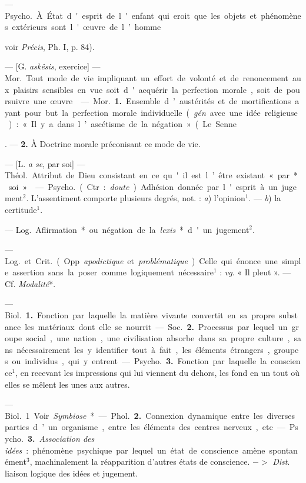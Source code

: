 \begin{itemize}[leftmargin=1cm, label=, itemsep=1pt]
{{{{ — \si{Psycho.} À État d'esprit
de l'enfant qui eroit que les objets
et phénomènes extérieurs sont l'œuvre de l’homme {voir {\it Précis}, Ph. I,
p. 84).

 — [G. {\it askêsis}, exercice] — \si{Mor.}
Tout mode de vie impliquant un
effort de volonté et de renoncement
aux plaisirs sensibles en vue soit
d'acquérir la perfection morale, soit
de poursuivre une œuvre.

 — \si{Mor.} {\bf 1.} Ensemble d’austérités et de mortifications ayant
pour but la perfection morale individuelle ({\it gén}. avec une idée
religieuse) : « Il y a dans l’ascétisme de
la négation » (Le Senne}. — {\bf 2.} À
Doctrine morale préconisant ce
mode de vie.

 — [L. {\it a se}, par soi] — \si{Théol.}
Attribut de Dieu consistant en ce
qu'il est l’être existant « par* soi ».

 — \si{Psycho.} (Ctr. : {\it doute}).
Adhésion donnée par l'esprit à un
jugement$^2$. L’assentiment comporte
plusieurs degrés, not. : {\it a}) l'opinion$^1$.
— {\it b}) la certitude$^1$.

 — \si{Log.} Aflirmation* ou
négation de la {\it lexis}* d'un jugement$^2$.

 — \si{Log.}
et \si{Crit.} (Opp. {\it apodictique} et {\it problématique}). Celle qui énonce une
simple assertion sans la poser comme
logiquement nécessaire$^1$ : {\it vg}. « Il
pleut ». — Cf. {\it Modalité}*.


 — \si{Biol.} {\bf 1.} Fonction
par laquelle la matière vivante convertit en sa propre substance les
matériaux dont elle se nourrit.

— \si{Soc.} {\bf 2.} Processus par lequel un
groupe social, une nation, une civilisation absorbe dans sa propre
culture, sans nécessairement les y identifier tout à fait,
les éléments étrangers, groupes ou individus, qui y
entrent.

— \si{Psycho.} {\bf 3.} Fonction par laquelle la conscience$^1$, en recevant
les impressions qui lui viennent du
dehors, les fond en un tout où elles
se mêlent les unes aux autres.


 — \si{Biol.} 1 Voir {\it Symbiose}*.

— \si{Phol.} {\bf 2.} Connexion dynamique
entre les diverses parties d’un organisme, entre les éléments des centres
nerveux, etc.

— \si{Psycho.} {\bf 3.} {\it Association des
idées} : phénomène psychique par
lequel un état de conscience amène
spontanément$^3$, machinalement la
réapparition d’autres états de conscience. $->$ {\it Dist}. liaison logique
des idées et jugement.

}}}}
\end{itemize}
